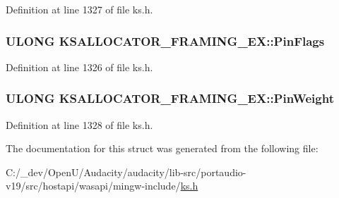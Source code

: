 Definition at line 1327 of file ks.\+h.

\subsubsection[{\texorpdfstring{Pin\+Flags}{PinFlags}}]{\setlength{\rightskip}{0pt plus 5cm}U\+L\+O\+NG K\+S\+A\+L\+L\+O\+C\+A\+T\+O\+R\+\_\+\+F\+R\+A\+M\+I\+N\+G\+\_\+\+E\+X\+::\+Pin\+Flags}\hypertarget{struct_k_s_a_l_l_o_c_a_t_o_r___f_r_a_m_i_n_g___e_x_a0afe8c8de7e36169d2e631f11a2630e8}{}\label{struct_k_s_a_l_l_o_c_a_t_o_r___f_r_a_m_i_n_g___e_x_a0afe8c8de7e36169d2e631f11a2630e8}


Definition at line 1326 of file ks.\+h.

\subsubsection[{\texorpdfstring{Pin\+Weight}{PinWeight}}]{\setlength{\rightskip}{0pt plus 5cm}U\+L\+O\+NG K\+S\+A\+L\+L\+O\+C\+A\+T\+O\+R\+\_\+\+F\+R\+A\+M\+I\+N\+G\+\_\+\+E\+X\+::\+Pin\+Weight}\hypertarget{struct_k_s_a_l_l_o_c_a_t_o_r___f_r_a_m_i_n_g___e_x_affcf03feed631448f9c5ffb86569801a}{}\label{struct_k_s_a_l_l_o_c_a_t_o_r___f_r_a_m_i_n_g___e_x_affcf03feed631448f9c5ffb86569801a}


Definition at line 1328 of file ks.\+h.



The documentation for this struct was generated from the following file\+:\begin{DoxyCompactItemize}
\item 
C\+:/\+\_\+dev/\+Open\+U/\+Audacity/audacity/lib-\/src/portaudio-\/v19/src/hostapi/wasapi/mingw-\/include/\hyperlink{ks_8h}{ks.\+h}\end{DoxyCompactItemize}
